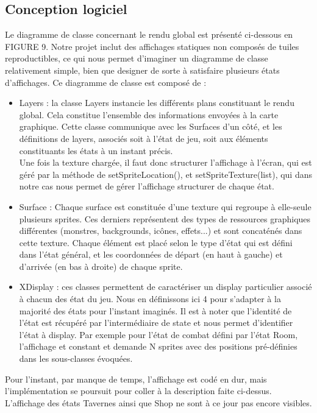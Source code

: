 \documentclass[a4paper,12pt]{article}
\begin{document}
\subsection{Conception logiciel}
Le diagramme de classe concernant le rendu global est présenté ci-dessous en FIGURE 9. Notre projet inclut des affichages statiques non composés de tuiles reproductibles, ce qui nous permet d'imaginer un diagramme de classe relativement simple, bien que designer de sorte à satisfaire plusieurs états d'affichages. Ce diagramme de classe est composé de : 
\newpage
\begin{itemize}
    \item Layers : la classe Layers instancie les différents plans constituant le rendu global. Cela constitue l'ensemble des informations envoyées à la carte graphique. Cette classe communique avec les Surfaces d'un côté, et les définitions de layers, associés soit à l'état de jeu, soit aux éléments constituants les états à un instant précis. 
    \\ Une fois la texture chargée, il faut donc structurer l'affichage à l'écran, qui est géré par la méthode de setSpriteLocation(), et setSpriteTexture(list), qui dans notre cas nous permet de gérer l'affichage structurer de chaque état. 
    \item Surface : Chaque surface est constituée d'une texture qui regroupe à elle-seule plusieurs sprites. Ces derniers représentent des types de ressources graphiques différentes (monstres, backgrounds, icônes, effets...) et sont concaténés dans cette texture. Chaque élément est placé selon le type d'état qui est défini dans l'état général, et les coordonnées de départ (en haut à gauche) et d'arrivée (en bas à droite) de chaque sprite.
    \item XDisplay : ces classes permettent de caractériser un display particulier associé à chacun des état du jeu. Nous en définissons ici 4 pour s'adapter à la majorité des états pour l'instant imaginés. Il est à noter que l'identité de l'état est récupéré par l'intermédiaire de state et nous permet d'identifier l'état à display. Par exemple pour l'état de combat défini par l'état Room, l'affichage et constant et demande N sprites avec des positions pré-définies dans les sous-classes évoquées.
\end{itemize}
Pour l'instant, par manque de temps, l'affichage est codé en dur, mais l'implémentation se poursuit pour coller à la description faite ci-dessus. L'affichage des états Tavernes ainsi que Shop ne sont à ce jour pas encore visibles. 
\end{document}
